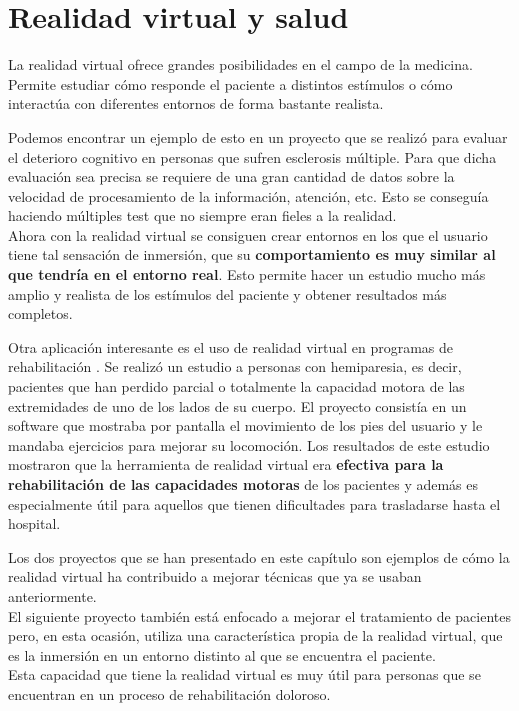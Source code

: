 \documentclass[twoside, 11pt]{epstfg}
\begin{document}
\section{Realidad virtual y salud}
\label{sec:VR y salud}

La realidad virtual ofrece grandes posibilidades en el campo de la medicina. Permite estudiar cómo responde el paciente a distintos estímulos o cómo interactúa con diferentes entornos de forma bastante realista.

Podemos encontrar un ejemplo de esto en un proyecto que se realizó para evaluar el deterioro cognitivo en personas que sufren esclerosis múltiple. Para que dicha evaluación sea precisa se requiere de una gran cantidad de datos sobre la velocidad de procesamiento de la información, atención, etc. Esto se conseguía haciendo múltiples test que no siempre eran fieles a la realidad.\\
Ahora con la realidad virtual se consiguen crear entornos en los que el usuario tiene tal sensación de inmersión, que su \textbf{comportamiento es muy similar al que tendría en el entorno real}. Esto permite hacer un estudio mucho más amplio y realista de los estímulos del paciente y obtener resultados más completos.\cite{LamargueHamel201594}


Otra aplicación interesante es el uso de realidad virtual en programas de rehabilitación \cite{hu2016virtual}.
Se realizó un estudio a personas con hemiparesia, es decir, pacientes que han perdido parcial o totalmente la capacidad motora de las extremidades de uno de los lados de su cuerpo. El proyecto consistía en un software que mostraba por pantalla el movimiento de los pies  del usuario y le mandaba ejercicios para mejorar su locomoción. 
Los resultados de este estudio mostraron que la herramienta de realidad virtual era \textbf{efectiva para la rehabilitación de las capacidades motoras} de los pacientes y además es especialmente útil para aquellos que tienen dificultades para trasladarse hasta el hospital.\cite{Llorens2015418}

Los dos proyectos que se han presentado en este capítulo son ejemplos de cómo la realidad virtual ha contribuido a mejorar técnicas que ya se usaban anteriormente.\\
El siguiente proyecto también está enfocado a mejorar el tratamiento de pacientes pero, en esta ocasión, utiliza una característica propia de la realidad virtual, que es la inmersión en un entorno distinto al que se encuentra el paciente.\\
Esta capacidad que tiene la realidad virtual es muy útil para personas que se encuentran en un proceso de rehabilitación doloroso.
\end{document}

